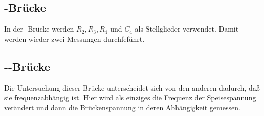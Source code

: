 \subsection{-Brücke}

In der -Brücke werden $R_2, R_3, R_4$ und $C_4$ als
Stellglieder verwendet. Damit werden wieder zwei Messungen durchfeführt.

\subsection{--Brücke}

Die Untersuchung dieser Brücke unterscheidet sich von den anderen
dadurch, daß sie frequenzabhängig ist. Hier wird als einziges die
Frequenz der Speisespannung verändert und dann die Brückenspannung in
deren Abhängigkeit gemessen.
